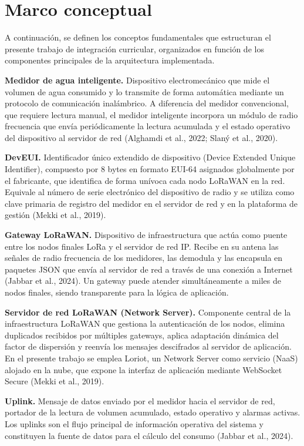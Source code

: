 \documentclass[12pt,a4paper,oneside]{report}
\begin{document}
\section{Marco conceptual}\label{marco-conceptual}

A continuación, se definen los conceptos fundamentales que estructuran el presente trabajo de integración curricular, organizados en función de los componentes principales de la arquitectura implementada.

\textbf{Medidor de agua inteligente.} Dispositivo electromecánico que mide el volumen de agua consumido y lo transmite de forma automática mediante un protocolo de comunicación inalámbrico. A diferencia del medidor convencional, que requiere lectura manual, el medidor inteligente incorpora un módulo de radio frecuencia que envía periódicamente la lectura acumulada y el estado operativo del dispositivo al servidor de red (Alghamdi et al., 2022; Slaný et al., 2020).

\textbf{DevEUI.} Identificador único extendido de dispositivo (Device Extended Unique Identifier), compuesto por 8 bytes en formato EUI-64 asignados globalmente por el fabricante, que identifica de forma unívoca cada nodo LoRaWAN en la red. Equivale al número de serie electrónico del dispositivo de radio y se utiliza como clave primaria de registro del medidor en el servidor de red y en la plataforma de gestión (Mekki et al., 2019).

\textbf{Gateway LoRaWAN.} Dispositivo de infraestructura que actúa como puente entre los nodos finales LoRa y el servidor de red IP. Recibe en su antena las señales de radio frecuencia de los medidores, las demodula y las encapsula en paquetes JSON que envía al servidor de red a través de una conexión a Internet (Jabbar et al., 2024). Un gateway puede atender simultáneamente a miles de nodos finales, siendo transparente para la lógica de aplicación.

\textbf{Servidor de red LoRaWAN (Network Server).} Componente central de la infraestructura LoRaWAN que gestiona la autenticación de los nodos, elimina duplicados recibidos por múltiples gateways, aplica adaptación dinámica del factor de dispersión y reenvía los mensajes descifrados al servidor de aplicación. En el presente trabajo se emplea Loriot, un Network Server como servicio (NaaS) alojado en la nube, que expone la interfaz de aplicación mediante WebSocket Secure (Mekki et al., 2019).

\textbf{Uplink.} Mensaje de datos enviado por el medidor hacia el servidor de red, portador de la lectura de volumen acumulado, estado operativo y alarmas activas. Los uplinks son el flujo principal de información operativa del sistema y constituyen la fuente de datos para el cálculo del consumo (Jabbar et al., 2024).
\end{document}
